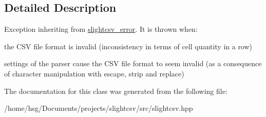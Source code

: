\subsection{Detailed Description}
Exception inheriting from \hyperlink{classutils_1_1slightcsv__error}{slightcsv\+\_\+error}. It is thrown when\+:
\begin{DoxyItemize}
\item the C\+SV file format is invalid (inconsistency in terms of cell quantity in a row)
\item settings of the parser cause the C\+SV file format to seem invalid (as a consequence of character manipulation with escape, strip and replace) 
\end{DoxyItemize}

The documentation for this class was generated from the following file\+:\begin{DoxyCompactItemize}
\item 
/home/hsg/\+Documents/projects/slightcsv/src/slightcsv.\+hpp\end{DoxyCompactItemize}
